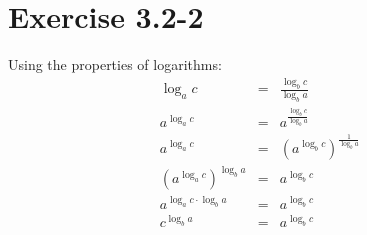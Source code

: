 \documentclass{article}
\begin{document}
\section*{Exercise 3.2-2}

Using the properties of logarithms:
\begin{eqnarray*}
	\log_a c & = & \frac{\log_b c}{\log_b a} \\
	a^{\log_a c} & = & a^{\frac{\log_b c}{\log_b a}} \\
	a^{\log_a c} & = & \left( a^{\log_b c} \right)^{\frac{1}{\log_b a}} \\
	\left( a^{\log_a c} \right)^{\log_b a} & = & a^{\log_b c} \\
	a^{\log_a c \cdot \log_b a} & = & a^{\log_b c} \\
	c^{\log_b a} & = & a^{\log_b c}
\end{eqnarray*}
\end{document}
